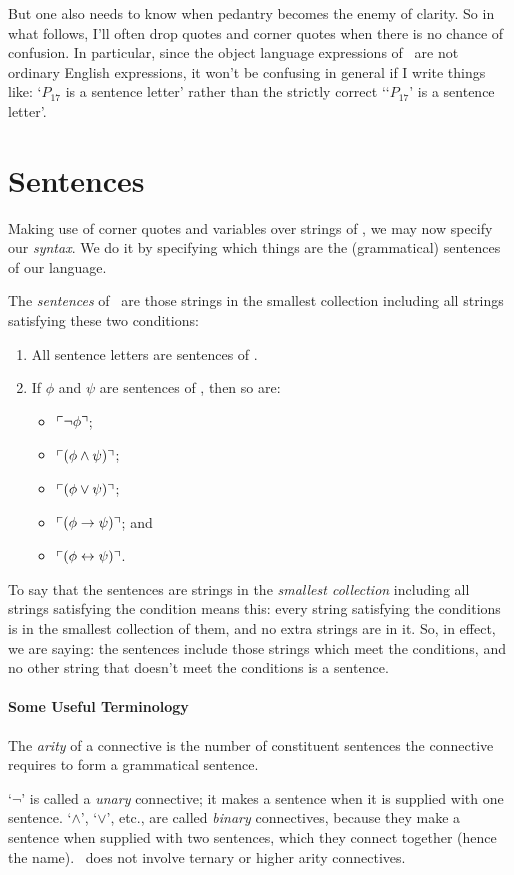 But one also needs to know when pedantry becomes the enemy of clarity. So in what follows, I'll often drop quotes and corner quotes when there is no chance of confusion. In particular, since the object language expressions of \lone\ are not ordinary English expressions, it won't be confusing in general if I write things like: `$P_{17}$ is a sentence letter' rather than the strictly correct `{`$P_{17}$'} is a sentence letter'. 


\section{Sentences}

Making use of corner quotes and variables over strings of \lone, we may now specify our \emph{syntax}. We do it by specifying which things are the (grammatical) sentences of our language.
	\begin{definition}
		\label{lone} The \emph{sentences} of \lone\ are those strings in the smallest collection including all strings satisfying these two conditions:
		\begin{enumerate}
			\item All sentence letters are sentences of \lone.
			\item If $\phi$ and $\psi$ are sentences of \lone, then so are: \begin{itemize}
				\item $\ulcorner \neg \phi \urcorner$;
				\item $\ulcorner (\phi \wedge \psi) \urcorner$;
				\item $\ulcorner (\phi \vee \psi) \urcorner$;
				\item $\ulcorner (\phi \to \psi) \urcorner$; and
				\item $\ulcorner (\phi \leftrightarrow \psi) \urcorner$. 
			\end{itemize}
		\end{enumerate} 
	\end{definition}
To say that the sentences are strings in the \emph{smallest collection} including all strings satisfying the condition means this: every string satisfying the conditions is in the smallest collection of them, and no extra strings are in it. So, in effect, we are saying: the sentences include those strings which meet the conditions, and no other string that doesn't meet the conditions is a sentence. 

\paragraph{Some Useful Terminology } \begin{definition}[Arity]
	The \emph{arity} of a connective is the number of constituent sentences the connective requires to form a grammatical sentence.
\end{definition} `$\neg$' is called a \emph{unary} connective; it makes a sentence when it is supplied with one sentence. `$\wedge$', `$\vee$', etc., are called \emph{binary} connectives, because they make a sentence when supplied with two sentences, which they connect together (hence the name). \lone\ does not involve ternary or higher arity connectives. 

